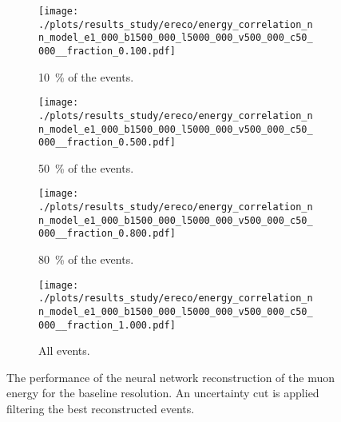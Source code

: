 \begin{figure}[H]
    \centering
    \begin{subfigure}{0.48\textwidth}
        \centering
        \texttt{[image: ./plots/results\_study/ereco/energy\_correlation\_nn\_model\_e1\_000\_b1500\_000\_l5000\_000\_v500\_000\_c50\_000\_\_fraction\_0.100.pdf]}
        \caption{\SI{10}{\%} of the events.}
        \label{fig:study_ereco_nn_base_perform_0.1}
    \end{subfigure}
    \hfill
    \begin{subfigure}{0.48\textwidth}
        \centering
        \texttt{[image: ./plots/results\_study/ereco/energy\_correlation\_nn\_model\_e1\_000\_b1500\_000\_l5000\_000\_v500\_000\_c50\_000\_\_fraction\_0.500.pdf]}
        \caption{\SI{50}{\%} of the events.}
        \label{fig:study_ereco_nn_base_perform_0.5}
    \end{subfigure}
    \begin{subfigure}{0.48\textwidth}
        \vspace{0.5cm}
        \centering
        \texttt{[image: ./plots/results\_study/ereco/energy\_correlation\_nn\_model\_e1\_000\_b1500\_000\_l5000\_000\_v500\_000\_c50\_000\_\_fraction\_0.800.pdf]}
        \caption{\SI{80}{\%} of the events.}
        \label{fig:study_ereco_nn_base_perform_0.8}
    \end{subfigure}
    \hfill
    \begin{subfigure}{0.48\textwidth}
        \vspace{0.5cm}
        \centering
        \texttt{[image: ./plots/results\_study/ereco/energy\_correlation\_nn\_model\_e1\_000\_b1500\_000\_l5000\_000\_v500\_000\_c50\_000\_\_fraction\_1.000.pdf]}
        \caption{All events.}
        \label{fig:study_ereco_nn_base_perform_1.0}
    \end{subfigure}
    \caption{The performance of the neural network reconstruction of the muon energy for the baseline resolution. An uncertainty cut is applied filtering the best reconstructed events.}
    \label{fig:study_ereco_nn_base_perform}
\end{figure}

